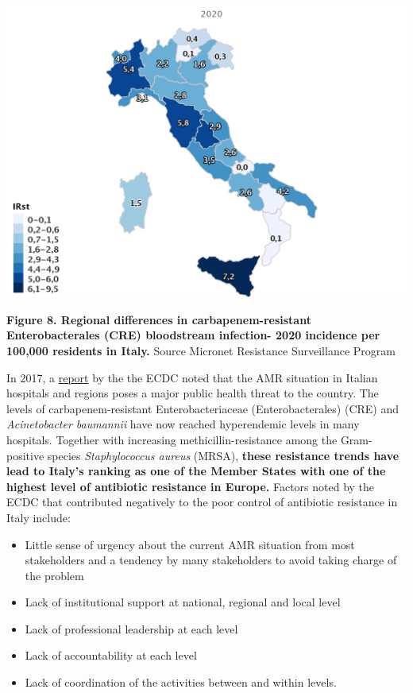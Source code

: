 \documentclass[
  11pt,
  paper=a4,
  ,captions=tableheading
]{scrartcl}
\providecommand{\tightlist}{%
  \setlength{\itemsep}{0pt}\setlength{\parskip}{0pt}}
\begin{document}
\includegraphics[width=6.25in,height=\textheight]{images/Italia_CRE.png}

\textbf{Figure 8. Regional differences in carbapenem-resistant
Enterobacterales (CRE) bloodstream infection- 2020 incidence per 100,000
residents in Italy.} Source Micronet Resistance Surveillance Program

In 2017, a
\href{https://www.ecdc.europa.eu/en/publications-data/ecdc-country-visit-italy-discuss-antimicrobial-resistance-issues}{report}
by the the ECDC noted that the AMR situation in Italian hospitals and
regions poses a major public health threat to the country. The levels of
carbapenem-resistant Enterobacteriaceae (Enterobacterales) (CRE) and
\emph{Acinetobacter baumannii} have now reached hyperendemic levels in
many hospitals. Together with increasing methicillin-resistance among
the Gram-positive species \emph{Staphylococcus aureus} (MRSA),
\textbf{these resistance trends have lead to Italy's ranking as one of
the Member States with one of the highest level of antibiotic resistance
in Europe.} Factors noted by the ECDC that contributed negatively to the
poor control of antibiotic resistance in Italy include:

\begin{itemize}
\tightlist
\item
  Little sense of urgency about the current AMR situation from most
  stakeholders and a tendency by many stakeholders to avoid taking
  charge of the problem
\item
  Lack of institutional support at national, regional and local level
\item
  Lack of professional leadership at each level
\item
  Lack of accountability at each level
\item
  Lack of coordination of the activities between and within levels.
\end{itemize}
\end{document}

